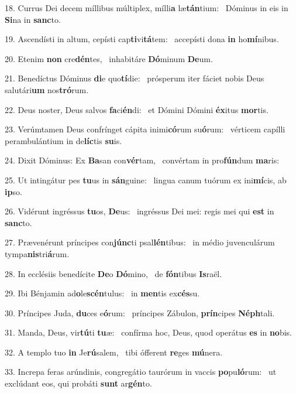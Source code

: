 18. Currus Dei decem míllibus múltiplex, mílli\textbf{a} læ\textbf{tán}tium: \ast\  Dóminus in eis in \textbf{Si}na in \textbf{sanc}to.\

19. Ascendísti in altum, cepísti cap\textbf{ti}vi\textbf{tá}tem: \ast\  accepísti dona \textbf{in} ho\textbf{mí}nibus.\

20. Etenim \textbf{non} cre\textbf{dén}tes, \ast\  inhabitáre \textbf{Dó}minum \textbf{De}um.\

21. Benedíctus Dóminus \textbf{di}e quo\textbf{tí}die: \ast\  prósperum iter fáciet nobis Deus salutári\textbf{um} nos\textbf{tró}rum.\

22. Deus noster, Deus salvos \textbf{fa}ci\textbf{én}di: \ast\  et Dómini Dómini \textbf{éx}itus \textbf{mor}tis.\

23. Verúmtamen Deus confrínget cápita inimi\textbf{có}rum su\textbf{ó}rum: \ast\  vérticem capílli perambulántium in de\textbf{líc}tis \textbf{su}is.\

24. Dixit Dóminus: Ex \textbf{Ba}san con\textbf{vér}tam, \ast\  convértam in pro\textbf{fún}dum \textbf{ma}ris:\

25. Ut intingátur pes \textbf{tu}us in \textbf{sán}guine: \ast\  lingua canum tuórum ex ini\textbf{mí}cis, ab \textbf{ip}so.\

26. Vidérunt ingréssus \textbf{tu}os, \textbf{De}us: \ast\  ingréssus Dei mei: regis mei qui \textbf{est} in \textbf{sanc}to.\

27. Prævenérunt príncipes con\textbf{júnc}ti psal\textbf{lén}tibus: \ast\  in médio juvenculárum tympa\textbf{nis}tri\textbf{á}rum.\

28. In ecclésiis benedícite \textbf{De}o \textbf{Dó}mino, \ast\  de \textbf{fón}tibus \textbf{Is}raël.\

29. Ibi Bénjamin ad\textbf{o}le\textbf{scén}tulus: \ast\  in \textbf{men}tis ex\textbf{cés}su.\

30. Príncipes Juda, \textbf{du}ces e\textbf{ó}rum: \ast\  príncipes Zábulon, \textbf{prín}cipes \textbf{Néph}tali.\

31. Manda, Deus, vir\textbf{tú}ti \textbf{tu}æ: \ast\  confírma hoc, Deus, quod operátus \textbf{es} in \textbf{no}bis.\

32. A templo tuo \textbf{in} Je\textbf{rú}salem, \ast\  tibi ófferent \textbf{re}ges \textbf{mú}nera.\

33. Increpa feras arúndinis, congregátio taurórum in vaccis \textbf{po}pu\textbf{ló}rum: \ast\  ut exclúdant eos, qui probáti \textbf{sunt} ar\textbf{gén}to.\

